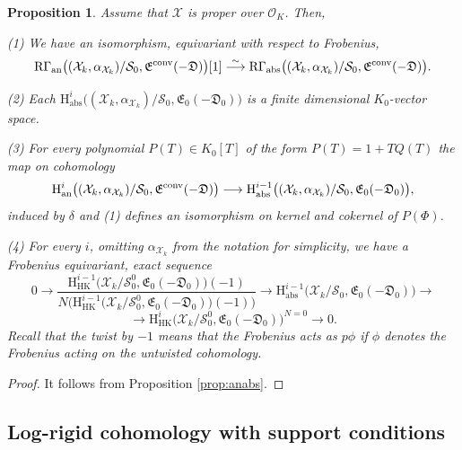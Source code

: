 \documentclass[asterisque,english]{smfart}
\newtheorem{proposition}[theo]{Proposition}
\begin{document}
\begin{proposition}\label{prop:anabscompact} Assume that $\mathcal{X}$ is proper over $\mathcal{O}_K$. Then, \smallskip

(1) We have an isomorphism, equivariant with respect to Frobenius, $$\mathrm{R}\Gamma_{\mathrm{an}}\bigl((\mathcal{X}_k,\alpha_{\mathcal{X}_k})/\mathcal{S}_0,\mathfrak{E}^{\rm conv}(-\mathfrak{D})\bigr)[1]\stackrel{\sim}{ \longrightarrow} \mathrm{R}\Gamma_{\mathrm{abs}}\bigl((\mathcal{X}_k,\alpha_{\mathcal{X}_k})/\mathcal{S}_0,\mathfrak{E}^{\rm conv}(-\mathfrak{D})\bigr).$$

(2) Each $\mathrm{H}^i_{\mathrm{abs}}\bigl((\mathcal{X}_k,\alpha_{\mathcal{X}_k})/\mathcal{S}_0,\mathfrak{E}_0(-\mathfrak{D}_0)\bigr)$ is a finite dimensional $K_0$-vector space.

\smallskip

(3) For every polynomial $P(T)\in K_0[T]$ of the form $P(T)=1+ T Q(T)$ the map on cohomology $$\mathrm{H}^i_{\mathrm{an}}\bigl((\mathcal{X}_k,\alpha_{\mathcal{X}_k})/\mathcal{S}_0,\mathfrak{E}^{\rm conv}(-\mathfrak{D})\bigr)\longrightarrow \mathrm{H}^{i-1}_{\mathrm{abs}}\bigl((\mathcal{X}_k,\alpha_{\mathcal{X}_k})/\mathcal{S}_0,\mathfrak{E}_0(-\mathfrak{D}_0)\bigr),$$induced by  $\delta$ and (1) defines an isomorphism on kernel and cokernel of $P(\Phi)$.

\smallskip

(4) For every $i$, omitting $\alpha_{\mathcal{X}_k}$ from the notation for simplicity, we have a Frobenius equivariant, exact sequence $$0\longrightarrow \frac{\mathrm{H}^{i-1}_{\mathrm{HK}}\bigl(\mathcal{X}_k/ \mathcal{S}_0^0,\mathfrak{E}_0(-\mathfrak{D}_0)\bigr)(-1)}{N\bigl(\mathrm{H}^{i-1}_{\mathrm{HK}}\bigl(\mathcal{X}_k/ \mathcal{S}_0^0,\mathfrak{E}_0(-\mathfrak{D}_0)\bigr)(-1)\bigr)} \longrightarrow \mathrm{H}^{i-1}_{\mathrm{abs}}\bigl(\mathcal{X}_k/\mathcal{S}_0,\mathfrak{E}_0(-\mathfrak{D}_0)\bigr) \longrightarrow $$ $$\longrightarrow \mathrm{H}^i_{\mathrm{HK}}\bigl(\mathcal{X}_k/ \mathcal{S}_0^0,\mathfrak{E}_0(-\mathfrak{D}_0)\bigr)^{N=0} \longrightarrow 0.$$
Recall that the twist by $-1$ means that the Frobenius acts as $p\phi$ if $\phi$ denotes the Frobenius acting on the untwisted cohomology.

\end{proposition}
\begin{proof}  It follows from Proposition \ref{prop:anabs}.

\end{proof}


\subsection{Log-rigid cohomology with support conditions}\label{sec:rigcmpct} 
\end{document}
